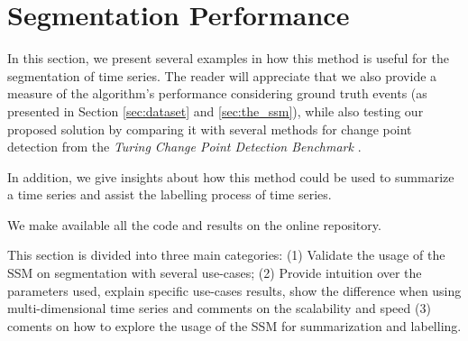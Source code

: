 


\section{Segmentation Performance}

In this section, we present several examples in how this method is useful for the segmentation of time series. The reader will appreciate that we also provide a measure of the algorithm's performance considering ground truth events (as presented in Section \ref{sec:dataset} and \ref{sec:the_ssm}), while also testing our proposed solution by comparing it with several methods for change point detection from the \textit{Turing Change Point Detection Benchmark} \cite{cpd_alan}.
\par
In addition, we give insights about how this method could be used to summarize a time series and assist the labelling process of time series.
\par
We make available all the code and results on the online repository.
\par
This section is divided into three main categories: (1) Validate the usage of the \gls{SSM} on segmentation with several use-cases; (2) Provide intuition over the parameters used, explain specific use-cases results, show the difference when using multi-dimensional time series and comments on the scalability and speed (3) coments on how to explore the usage of the \gls{SSM} for summarization and labelling.


